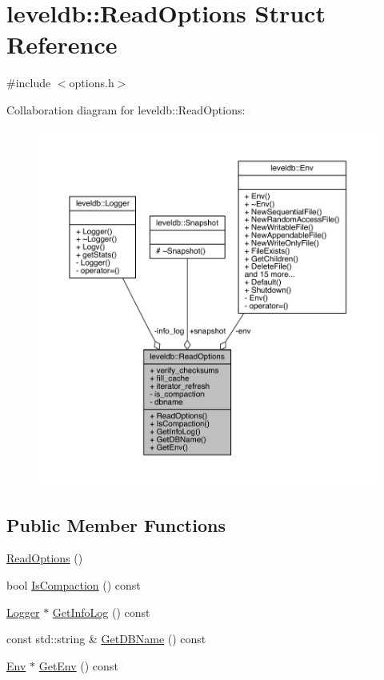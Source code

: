 \hypertarget{structleveldb_1_1_read_options}{}\section{leveldb\+:\+:Read\+Options Struct Reference}
\label{structleveldb_1_1_read_options}


{\ttfamily \#include $<$options.\+h$>$}



Collaboration diagram for leveldb\+:\+:Read\+Options\+:
\nopagebreak
\begin{figure}[H]
\begin{center}
\leavevmode
\includegraphics[width=350pt]{structleveldb_1_1_read_options__coll__graph}
\end{center}
\end{figure}
\subsection*{Public Member Functions}
\begin{DoxyCompactItemize}
\item 
\hyperlink{structleveldb_1_1_read_options_a6bf119f5a33b0d0a70fb60d8114351ef}{Read\+Options} ()
\item 
bool \hyperlink{structleveldb_1_1_read_options_a924feccae37fd1e4635875c243dc46cf}{Is\+Compaction} () const 
\item 
\hyperlink{classleveldb_1_1_logger}{Logger} $\ast$ \hyperlink{structleveldb_1_1_read_options_ac67da0bed402e390a2c58fb8216bf85f}{Get\+Info\+Log} () const 
\item 
const std\+::string \& \hyperlink{structleveldb_1_1_read_options_a04ac03549d9191c2b8d3d71d8aff5caf}{Get\+D\+B\+Name} () const 
\item 
\hyperlink{classleveldb_1_1_env}{Env} $\ast$ \hyperlink{structleveldb_1_1_read_options_ab8e38306b4d1a0725d3f5b7e92498aef}{Get\+Env} () const 
\end{DoxyCompactItemize}
